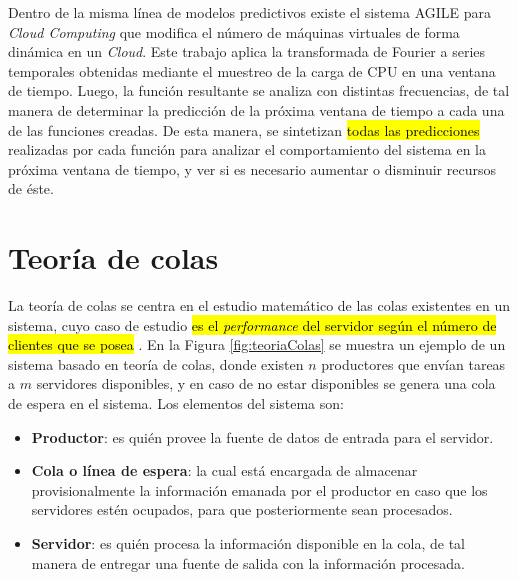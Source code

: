 Dentro de la misma línea de modelos predictivos existe el sistema AGILE \citep{NguyenSGSW13} para \textit{Cloud Computing} que modifica el número de máquinas virtuales de forma dinámica en un \textit{Cloud}. Este trabajo aplica la transformada de Fourier \citep{falk2012first} a series temporales obtenidas mediante el muestreo de la carga de CPU en una ventana de tiempo. Luego, la función resultante se analiza con distintas frecuencias, de tal manera de determinar la predicción de la próxima ventana de tiempo a cada una de las funciones creadas. De esta manera, se sintetizan \hl{todas las predicciones} realizadas por cada función para analizar el comportamiento del sistema en la próxima ventana de tiempo, y ver si es necesario aumentar o disminuir recursos de éste.

\section{Teoría de colas}
\label{sec:teoriaColas}

La teoría de colas se centra en el estudio matemático de las colas existentes en un sistema, cuyo caso de estudio \hl{es el \textit{performance} del servidor según el número de clientes que se posea} \citep{cooper1972introduction}. En la Figura \ref{fig:teoriaColas} se muestra un ejemplo de un sistema basado en teoría de colas, donde existen $n$ productores que envían tareas a $m$ servidores disponibles, y en caso de no estar disponibles se genera una cola de espera en el sistema. Los elementos del sistema son:

\begin{itemize}
	\item \textbf{Productor}: es quién provee la fuente de datos de entrada para el servidor.
	\item \textbf{Cola o línea de espera}: la cual está encargada de almacenar provisionalmente la información emanada por el productor en caso que los servidores estén ocupados, para que posteriormente sean procesados.
	\item \textbf{Servidor}: es quién procesa la información disponible en la cola, de tal manera de entregar una fuente de salida con la información procesada.
\end{itemize}

